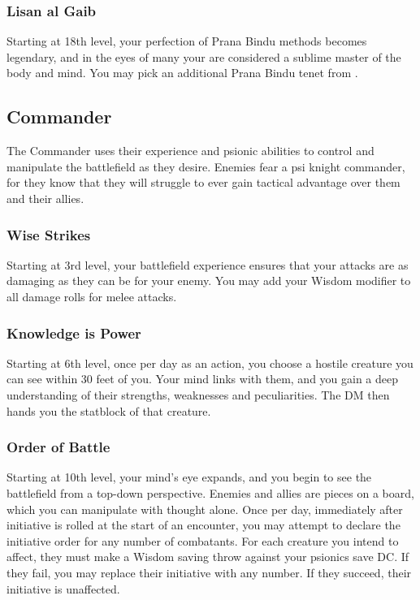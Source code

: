 \subsubsection{Lisan al Gaib}
Starting at 18th level,
your perfection of Prana Bindu methods becomes legendary,
and in the eyes of many your are considered a
sublime master of the body and mind.
You may pick an additional Prana Bindu tenet from
.

\subsection{Commander}
The Commander uses their experience and psionic abilities
to control and manipulate the battlefield as they desire.
Enemies fear a psi knight commander,
for they know that they will struggle to ever
gain tactical advantage over them and their allies.

\subsubsection{Wise Strikes}
Starting at 3rd level,
your battlefield experience ensures that your attacks
are as damaging as they can be for your enemy.
You may add your Wisdom modifier to all damage
rolls for melee attacks. 

\subsubsection{Knowledge is Power}
Starting at 6th level,
once per day as an action,
you choose a hostile creature you can see within
30 feet of you.
Your mind links with them,
and you gain a deep understanding of their
strengths, weaknesses and peculiarities.
The DM then hands you the statblock of that creature.

\subsubsection{Order of Battle}
Starting at 10th level,
your mind's eye expands,
and you begin to see the battlefield from a top-down perspective.
Enemies and allies are pieces on a board, which you can manipulate
with thought alone.
Once per day,
immediately after initiative is rolled at the start of an encounter,
you may attempt to declare the initiative order for
any number of combatants.
For each creature you intend to affect,
they must make a Wisdom saving throw against your psionics save DC.
If they fail, you may replace their initiative with any number.
If they succeed, their initiative is unaffected. 

